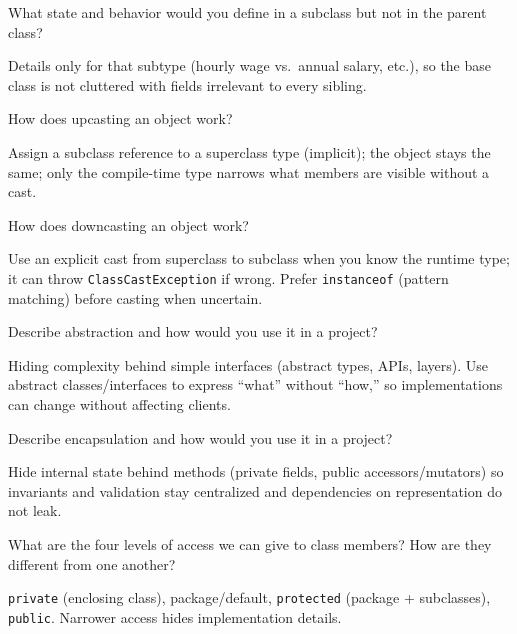 \question[4]
What state and behavior would you define in a subclass but not in the parent class?
\begin{solutionorbox}[1.45in]
  Details only for that subtype (hourly wage vs.\ annual salary, etc.), so the base class is not cluttered with fields irrelevant to every sibling.
\end{solutionorbox}

\question[4]
How does upcasting an object work?
\begin{solutionorbox}[1.15in]
  Assign a subclass reference to a superclass type (implicit); the object stays the same; only the compile-time type narrows what members are visible without a cast.
\end{solutionorbox}

\question[4]
How does downcasting an object work?
\begin{solutionorbox}[1.2in]
  Use an explicit cast from superclass to subclass when you know the runtime type; it can throw \texttt{ClassCastException} if wrong. Prefer \texttt{instanceof} (pattern matching) before casting when uncertain.
\end{solutionorbox}

\newpage


\question[4]
Describe abstraction and how would you use it in a project?
\begin{solutionorbox}[1.45in]
  Hiding complexity behind simple interfaces (abstract types, APIs, layers). Use abstract classes/interfaces to express ``what'' without ``how,'' so implementations can change without affecting clients.
\end{solutionorbox}

\question[4]
Describe encapsulation and how would you use it in a project?
\begin{solutionorbox}[1.45in]
  Hide internal state behind methods (private fields, public accessors/mutators) so invariants and validation stay centralized and dependencies on representation do not leak.
\end{solutionorbox}

\question[4]
What are the four levels of access we can give to class members? How are they different from one another?
\begin{solutionorbox}[1.55in]
  \texttt{private} (enclosing class), package/default, \texttt{protected} (package + subclasses), \texttt{public}. Narrower access hides implementation details.
\end{solutionorbox}

